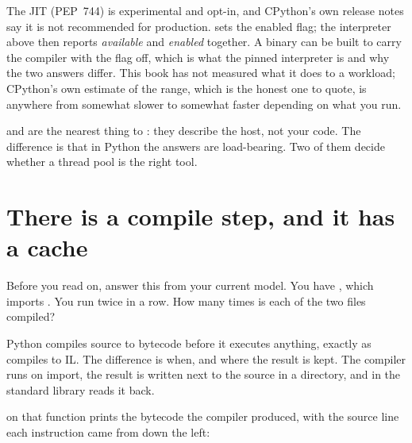 \begin{versionbox}
The \pyver{} JIT (PEP~744) is experimental and opt-in, and CPython's own
release notes say it is not recommended for production. 
sets the enabled flag; the interpreter above then reports \emph{available}
and \emph{enabled} together. A binary can be built to carry the compiler
with the flag off, which is what the pinned interpreter is and why the two
answers differ. This book has not measured what it does to a workload;
CPython's own estimate of the range, which is the honest one to quote, is
anywhere from somewhat slower to somewhat faster depending on what you run.
\end{versionbox}

\begin{csbox}
 and  are the
nearest thing to : they
describe the host, not your code. The difference is that in Python the
answers are load-bearing. Two of them decide whether a thread pool is the
right tool.
\end{csbox}

\section{There is a compile step, and it has a cache}
\label{sec:ch01-bytecode}

\noindent
Before you read on, answer this from your current model. You have
, which imports . You run 
twice in a row. How many times is each of the two files compiled?

\medskip
\noindent
Python compiles source to bytecode before it executes anything, exactly as
 compiles to IL. The difference is when, and where the result is
kept. The compiler runs on import, the result is written next to the source
in a  directory, and  in the standard library
reads it back.


\noindent
{} on that function prints the bytecode the compiler produced,
with the source line each instruction came from down the left:


